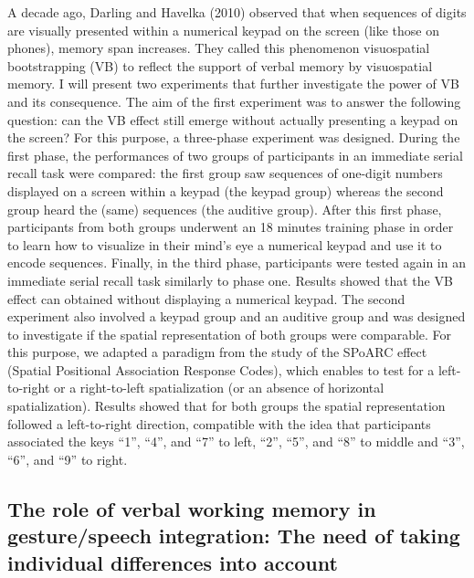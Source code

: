 \documentclass[
  12pt,
]{book}
\begin{document}
A decade ago, Darling and Havelka (2010) observed that when sequences of digits are visually presented within a numerical keypad on the screen (like those on phones), memory span increases. They called this phenomenon visuospatial bootstrapping (VB) to reflect the support of verbal memory by visuospatial memory. I will present two experiments that further investigate the power of VB and its consequence. The aim of the first experiment was to answer the following question: can the VB effect still emerge without actually presenting a keypad on the screen? For this purpose, a three-phase experiment was designed. During the first phase, the performances of two groups of participants in an immediate serial recall task were compared: the first group saw sequences of one-digit numbers displayed on a screen within a keypad (the keypad group) whereas the second group heard the (same) sequences (the auditive group). After this first phase, participants from both groups underwent an 18 minutes training phase in order to learn how to visualize in their mind's eye a numerical keypad and use it to encode sequences. Finally, in the third phase, participants were tested again in an immediate serial recall task similarly to phase one. Results showed that the VB effect can obtained without displaying a numerical keypad. The second experiment also involved a keypad group and an auditive group and was designed to investigate if the spatial representation of both groups were comparable. For this purpose, we adapted a paradigm from the study of the SPoARC effect (Spatial Positional Association Response Codes), which enables to test for a left-to-right or a right-to-left spatialization (or an absence of horizontal spatialization). Results showed that for both groups the spatial representation followed a left-to-right direction, compatible with the idea that participants associated the keys ``1'', ``4'', and ``7'' to left, ``2'', ``5'', and ``8'' to middle and ``3'', ``6'', and ``9'' to right.

\hypertarget{the-role-of-verbal-working-memory-in-gesturespeech-integration-the-need-of-taking-individual-differences-into-account}{%
\subsection{The role of verbal working memory in gesture/speech integration: The need of taking individual differences into account}\label{the-role-of-verbal-working-memory-in-gesturespeech-integration-the-need-of-taking-individual-differences-into-account}}
\end{document}
